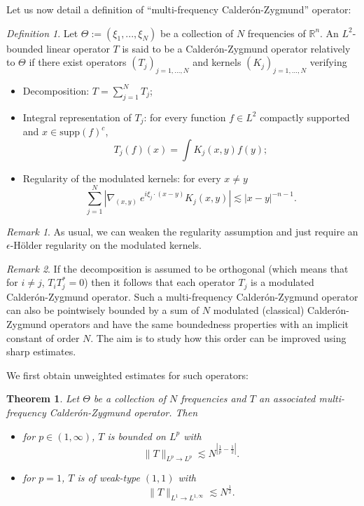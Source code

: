 \documentclass[11pt]{amsart}
\newtheorem{theorem}{Theorem}[section]
\theoremstyle{remark}
\newtheorem{dfn}{Definition}[section]
\newtheorem{remark}{Remark}[section]
\newcommand{\R}{{\mathbb R}}
\begin{document}
Let us now detail a definition of ``multi-frequency Calder\'on-Zygmund'' operator:

\begin{dfn} Let $\Theta:=(\xi_1,...,\xi_N)$ be a collection of $N$ frequencies of $\R^n$. An $L^2$-bounded linear operator $T$ is said to be a Calder\'on-Zygmund operator relatively to $\Theta$ if there exist operators $(T_j)_{j=1,...,N}$ and kernels $(K_j)_{j=1,...,N}$ verifying 
 \begin{itemize}
  \item Decomposition: $T=\sum_{j=1}^N T_j$;
  \item Integral representation of $T_j$: for every function $f\in L^2$ compactly supported and $x\in \textrm{supp}(f)^{c}$, 
  $$ T_j(f)(x) = \int K_j(x,y) f(y);$$
  \item Regularity of the modulated kernels: for every $x\neq y$
$$ \sum_{j=1}^N \left|\nabla_{(x,y)}\ e^{i\xi_j\cdot(x-y)} K_j(x,y)\right| \lesssim |x-y|^{-n-1}.$$
 \end{itemize}
\end{dfn}

\begin{remark}
As usual, we can weaken the regularity assumption and just require an $\epsilon$-H\"older regularity on the modulated kernels.
\end{remark}

\begin{remark}
If the decomposition is assumed to be orthogonal (which means that for $i\neq j$, $T_iT_j^*=0$) then it follows that each operator $T_j$ is a modulated Calder\'on-Zygmund operator. Such a multi-frequency Calder\'on-Zygmund operator can also be pointwisely bounded by a sum of $N$ modulated (classical) Calder\'on-Zygmund operators and have the same boundedness properties with an implicit constant of order $N$. The aim is to study how this order can be improved using sharp estimates.
\end{remark}

We first obtain unweighted estimates for such operators:
\begin{theorem} \label{thm:boundedness} Let $\Theta$ be a collection of $N$ frequencies and $T$ an associated multi-frequency Calder\'on-Zygmund operator. Then 
\begin{itemize}
 \item for $p\in(1,\infty)$, $T$ is bounded on $L^p$ with
$$ \|T\|_{L^p \to L^p} \lesssim N^{\left|\frac{1}{p}-\frac{1}{2}\right|}.$$
 \item for $p=1$, $T$ is of weak-type $(1,1)$ with
$$ \|T\|_{L^1 \to L^{1,\infty}} \lesssim N^{\frac{1}{2}}.$$
\end{itemize}
\end{theorem}
\end{document}
